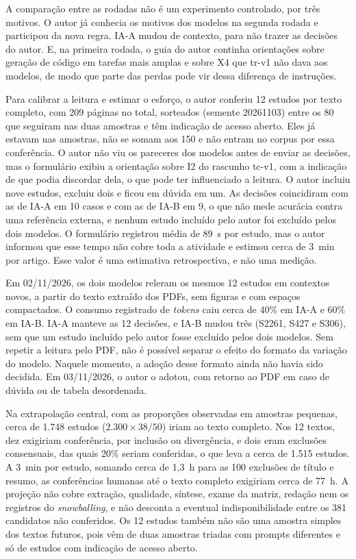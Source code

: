A comparação entre as rodadas não é um experimento controlado, por três motivos. O autor já conhecia os
motivos dos modelos na segunda rodada e participou da nova regra. IA-A mudou de contexto, para não trazer
as decisões do autor. E, na primeira rodada, o guia do autor continha orientações sobre geração de código
em tarefas mais amplas e sobre X4 que tr-v1 não dava aos modelos, de modo que parte das perdas pode vir
dessa diferença de instruções.

Para calibrar a leitura e estimar o esforço, o autor conferiu 12 estudos por texto completo, com 209
páginas no total, sorteados (semente 20261103) entre os 80 que seguiram nas duas amostras e têm indicação
de acesso aberto. Eles já estavam nas amostras, não se somam aos 150 e não entram no corpus por essa
conferência. O autor não viu os pareceres dos modelos antes de enviar as decisões, mas o formulário
exibiu a orientação sobre I2 do rascunho tc-v1, com a indicação de que podia discordar dela, o que pode ter
influenciado a leitura. O autor incluiu nove
estudos, excluiu dois e ficou em dúvida em um. As decisões coincidiram com as de IA-A em 10 casos e com
as de IA-B em 9, o que não mede acurácia contra uma referência externa, e nenhum estudo incluído pelo
autor foi excluído pelos dois modelos. O formulário registrou média de 89~s por estudo, mas o autor
informou que esse tempo não cobre toda a atividade e estimou cerca de 3~min por artigo. Esse valor é uma
estimativa retrospectiva, e não uma medição.

Em 02/11/2026, os dois modelos releram os mesmos 12 estudos em contextos novos, a partir do texto extraído
dos PDFs, sem figuras e com espaços compactados. O consumo registrado de \textit{tokens} caiu cerca de 40\%
em IA-A e 60\% em IA-B. IA-A manteve as 12 decisões, e IA-B mudou três (S2261, S427 e S306), sem que um
estudo incluído pelo autor fosse excluído pelos dois modelos. Sem repetir a leitura pelo PDF, não é possível
separar o efeito do formato da variação do modelo. Naquele momento, a adoção desse formato ainda não havia sido
decidida. Em 03/11/2026, o autor o adotou, com retorno ao PDF em caso de dúvida ou de tabela desordenada.

Na extrapolação central, com as proporções observadas em amostras pequenas, cerca de 1.748 estudos
($2.300 \times 38/50$) iriam ao texto completo. Nos 12 textos, dez exigiriam conferência, por inclusão ou
divergência, e dois eram exclusões consensuais, das quais 20\% seriam conferidas, o que leva a cerca de 1.515
estudos. A 3~min por estudo, somando cerca de 1,3~h para as 100 exclusões de título e resumo, as conferências
humanas até o texto completo exigiriam cerca de 77~h. A projeção não cobre extração, qualidade, síntese, exame
da matriz, redação nem os registros do \textit{snowballing}, e não desconta a eventual indisponibilidade entre
os 381 candidatos não conferidos. Os 12 estudos também não são uma amostra simples dos textos futuros, pois
vêm de duas amostras triadas com prompts diferentes e só de estudos com indicação de acesso aberto.

